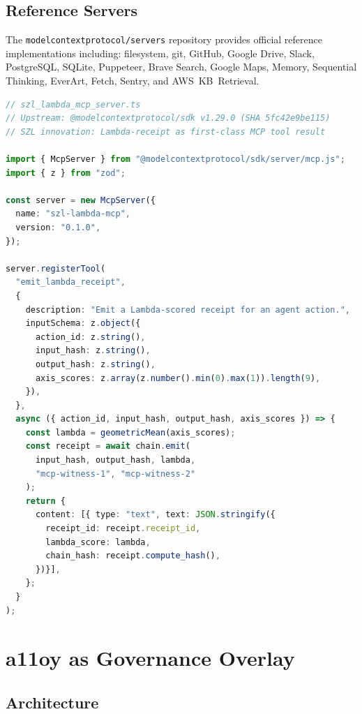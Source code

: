 \subsection{Reference Servers}
\label{ssec:mcp-servers}

The \texttt{modelcontextprotocol/servers} repository provides official
reference implementations including: filesystem, git, GitHub, Google Drive,
Slack, PostgreSQL, SQLite, Puppeteer, Brave Search, Google Maps, Memory,
Sequential Thinking, EverArt, Fetch, Sentry, and AWS~KB~Retrieval.

\begin{lstlisting}[language=TypeScript, caption={Minimal MCP server with
  \(\Lambda\)-receipt tool}, label={lst:mcp-server}]
// szl_lambda_mcp_server.ts
// Upstream: @modelcontextprotocol/sdk v1.29.0 (SHA 5fc42e9be115)
// SZL innovation: Lambda-receipt as first-class MCP tool result

import { McpServer } from "@modelcontextprotocol/sdk/server/mcp.js";
import { z } from "zod";

const server = new McpServer({
  name: "szl-lambda-mcp",
  version: "0.1.0",
});

server.registerTool(
  "emit_lambda_receipt",
  {
    description: "Emit a Lambda-scored receipt for an agent action.",
    inputSchema: z.object({
      action_id: z.string(),
      input_hash: z.string(),
      output_hash: z.string(),
      axis_scores: z.array(z.number().min(0).max(1)).length(9),
    }),
  },
  async ({ action_id, input_hash, output_hash, axis_scores }) => {
    const lambda = geometricMean(axis_scores);
    const receipt = await chain.emit(
      input_hash, output_hash, lambda,
      "mcp-witness-1", "mcp-witness-2"
    );
    return {
      content: [{ type: "text", text: JSON.stringify({
        receipt_id: receipt.receipt_id,
        lambda_score: lambda,
        chain_hash: receipt.compute_hash(),
      })}],
    };
  }
);
\end{lstlisting}

\section{a11oy as Governance Overlay}
\label{sec:a11oy}

\subsection{Architecture}
\label{ssec:a11oy-arch}

